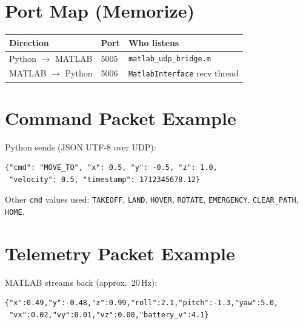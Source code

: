 \documentclass[11pt,a4paper]{article}
\begin{document}
\section{Port Map (Memorize)}

\begin{center}
\end{center}

\begin{center}
\small
\begin{tabular}{lll}
\toprule
\textbf{Direction} & \textbf{Port} & \textbf{Who listens} \\
\midrule
Python $\to$ MATLAB & 5005 & \texttt{matlab\_udp\_bridge.m} \\
MATLAB $\to$ Python & 5006 & \texttt{MatlabInterface} recv thread \\
\bottomrule
\end{tabular}
\end{center}

\section{Command Packet Example}

Python sends (JSON UTF-8 over UDP):
\begin{verbatim}
{"cmd": "MOVE_TO", "x": 0.5, "y": -0.5, "z": 1.0,
 "velocity": 0.5, "timestamp": 1712345678.12}
\end{verbatim}

Other \texttt{cmd} values used: \texttt{TAKEOFF}, \texttt{LAND}, \texttt{HOVER},
\texttt{ROTATE}, \texttt{EMERGENCY}, \texttt{CLEAR\_PATH}, \texttt{HOME}.

\section{Telemetry Packet Example}

MATLAB streams back (approx.\ 20\,Hz):
\begin{verbatim}
{"x":0.49,"y":-0.48,"z":0.99,"roll":2.1,"pitch":-1.3,"yaw":5.0,
 "vx":0.02,"vy":0.01,"vz":0.00,"battery_v":4.1}
\end{verbatim}
\end{document}
